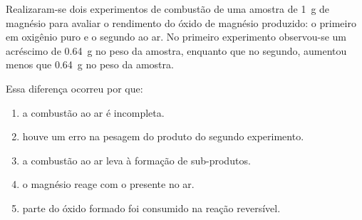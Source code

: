 Realizaram-se dois experimentos de combustão de uma amostra de \SI{1}{\gram} de magnésio para avaliar o rendimento do óxido de magnésio produzido:
o primeiro em oxigênio puro e o segundo ao ar.
No primeiro experimento observou-se um acréscimo de \SI{0,64}{\gram} no peso da amostra, enquanto que no segundo, aumentou menos que \SI{0,64}{\gram} no peso da amostra.

Essa diferença ocorreu por que:

\begin{enumerate}[label = (\scalealph{\alph*})]
	\item a combustão ao ar é incompleta.
	\item houve um erro na pesagem do produto do segundo experimento.
	\item a combustão ao ar leva à formação de sub-produtos.
	\item o magnésio reage com o  presente no ar.
	\item parte do óxido formado foi consumido na reação reversível.
\end{enumerate}

